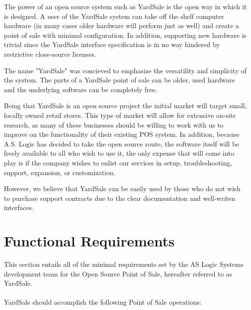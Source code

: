 \documentclass{report}
\begin{document}
The power of an open source system such as YardSale is the
open way in which it is designed.  A user of the YardSale system
can take off the shelf computer hardware (in many cases older hardware
will perform just as well) and create a point of sale with minimal
configuration.  In addition, supporting new hardware is trivial since
the YardSale interface specification is in no way hindered by
restrictive close-source licenses.

The name "YardSale" was concieved to emphasize the
versatility and simplicity of the system.  The parts of a
YardSale point of sale can be older, used hardware and
the underlying software can be completely free.

Being that YardSale is an open source project the initial
market will target small, locally owned retail
stores.  This type of market will allow for extensive on-site
research, as many of these businesses should be willing to work
with us to improve on the functionality of their existing POS
system.  In addition, because A.S. Logic has decided to take the
open source route, the software itself will be freely available to
all who wish to use it, the only expense that will come into play
is if the company wishes to enlist our services in setup,
troubleshooting, support, expansion, or customization.

However, we believe that YardSale can be easily used by
those who do not wish to purchase support contracts due to
the clear documentation and well-writen interfaces.

\section{Functional Requirements}

This section entails all of the minimal requirements set by the AS
Logic Systems development team for the Open Source Point of Sale, hereafter referred
to as YardSale.\\
\\YardSale should accomplish the
following Point of Sale operations:
\end{document}
